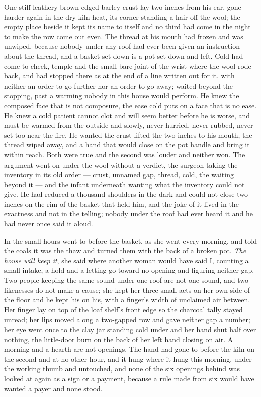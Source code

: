 One stiff leathery brown-edged barley crust lay two inches from his ear, gone harder again in the dry kiln heat, its corner standing a hair off the wool; the empty place beside it kept its name to itself and no third had come in the night to make the row come out even. The thread at his mouth had frozen and was unwiped, because nobody under any roof had ever been given an instruction about the thread, and a basket set down is a pot set down and left. Cold had come to cheek, temple and the small bare joint of the wrist where the wool rode back, and had stopped there as at the end of a line written out for it, with neither an order to go further nor an order to go away;  waited beyond the stopping, past a warming nobody in this house would perform. He knew the composed face that is not composure, the ease cold puts on a face that is no ease. He knew a cold patient cannot clot and will seem better before he is worse, and must be warmed from the outside and slowly, never hurried, never rubbed, never set too near the fire. He wanted the crust lifted the two inches to his mouth, the thread wiped away, and a hand that would close on the pot handle and bring it within reach. Both were true and the second was louder and neither won. The argument went on under the wool without a verdict, the surgeon taking the inventory in its old order --- crust, unnamed gap, thread, cold, the waiting beyond it --- and the infant underneath wanting what the inventory could not give. He had reduced a thousand shoulders in the dark and could not close two inches on the rim of the basket that held him, and the joke of it lived in the exactness and not in the telling; nobody under the roof had ever heard it and he had never once said it aloud.

In the small hours  went to  before the basket, as she went every morning, and told the coals it was the thaw and turned them with the back of a broken pot. \emph{The house will keep it}, she said where another woman would have said I, counting a small intake, a hold and a letting-go toward no opening and figuring neither gap. Two people keeping the same sound under one roof are not one sound, and two likenesses do not make a cause; she kept her three small acts on her own side of the floor and he kept his on his, with a finger's width of unclaimed air between. Her finger lay on top of the loaf shelf's front edge so the charcoal tally stayed unread; her lips moved along a two-gapped row and gave neither gap a number; her eye went once to the clay jar standing cold under  and her hand shut half over nothing, the little-door burn on the back of her left hand closing on air. A morning and a hearth are not openings. The hand had gone to  before the kiln on the second and at no other hour, and it hung where it hung this morning, under the working thumb and untouched, and none of the six openings behind was looked at again as a sign or a payment, because a rule made from six would have wanted a payer and none stood.

